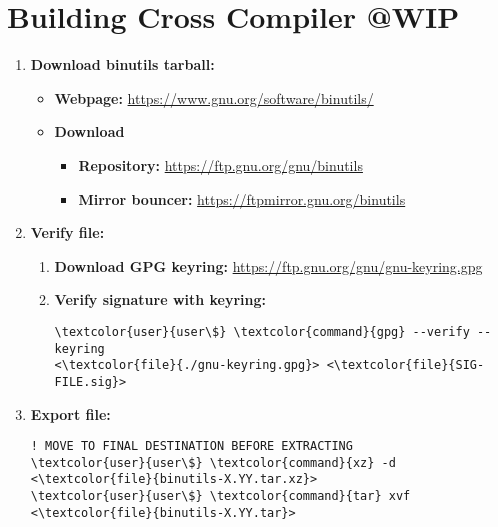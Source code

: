 \documentclass[10pt, a4paper, onecolumn, oneside, titlepage, openany]{book}
\begin{document}
\section{Building Cross Compiler @WIP}
\begin{enumerate}
    \item \textbf{Download binutils tarball:}
    \begin{itemize}
        \item \textbf{Webpage:} \url{https://www.gnu.org/software/binutils/}
        \item \textbf{Download}
        \begin{itemize}
            \item \textbf{Repository:} \url{https://ftp.gnu.org/gnu/binutils}
            \item \textbf{Mirror bouncer:} \url{https://ftpmirror.gnu.org/binutils}
        \end{itemize}
    \end{itemize}
    \item \textbf{Verify file:}
    \begin{enumerate}
        \item \textbf{Download GPG keyring:}
\newline \url{https://ftp.gnu.org/gnu/gnu-keyring.gpg}
        \item \textbf{Verify signature with keyring:}
\begin{Verbatim}[commandchars=\\\{\}]
\textcolor{user}{user\$} \textcolor{command}{gpg} --verify --keyring
<\textcolor{file}{./gnu-keyring.gpg}> <\textcolor{file}{SIG-FILE.sig}>
\end{Verbatim}
    \end{enumerate}
    \item \textbf{Export file:}
\begin{Verbatim}[commandchars=\\\{\}]
! MOVE TO FINAL DESTINATION BEFORE EXTRACTING
\textcolor{user}{user\$} \textcolor{command}{xz} -d <\textcolor{file}{binutils-X.YY.tar.xz}>
\textcolor{user}{user\$} \textcolor{command}{tar} xvf <\textcolor{file}{binutils-X.YY.tar}>
\end{Verbatim}
\end{enumerate}
\end{document}

